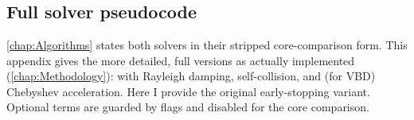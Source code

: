 \appendix
\chapter*{\fuggelek}
\setcounter{chapter}{\appendixnumber}



\section{Full solver pseudocode}
\label{sec:AppFullSolvers}
\autoref{chap:Algorithms} states both solvers in their stripped core-comparison
form. This appendix gives the more detailed, full versions as actually implemented
(\autoref{chap:Methodology}): with Rayleigh damping, self-collision, and (for VBD)
Chebyshev acceleration. Here I provide the original early-stopping variant.
Optional terms are guarded by flags and disabled for the core comparison.

